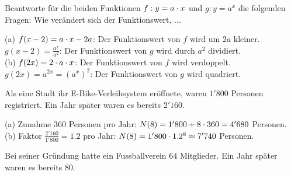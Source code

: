 \documentclass[11pt]{exam}
\begin{document}
\begin{questions}
\noaddpoints
\question[\totalpoints]
\addpoints
Beantworte für die beiden Funktionen $f:y=a\cdot x$ und $g:y=a^x$ die folgenden Fragen: Wie verändert sich der Funktionswert, ...
{\begin{solution}
		(a) $f(x-2)=a\cdot x-2a$: Der Funktionswert von $f$ wird um $2a$ kleiner. $g(x-2)=\frac{a^x}{a^2}$: Der Funktionswert von $g$ wird durch $a^2$ dividiert.\\
		(b) $f(2x)=2\cdot a\cdot x$: Der Funktionswert von $f$ wird verdoppelt. $g(2x)=a^{2x}=\left(a^x\right)^2$: Der Funktionswert von $g$ wird quadriert.
\end{solution}}
{}

\question[4]
Als eine Stadt ihr E-Bike-Verleihsystem eröffnete, waren $1'800$ Personen registriert. Ein Jahr später waren es bereits $2'160$.
{\begin{solution}
		(a) Zunahme $360$ Personen pro Jahr: $N(8)=1'800+8\cdot360=4'680$ Personen.\\
		(b) Faktor $\frac{2'160}{1'800}=1.2$ pro Jahr: $N(8)=1'800\cdot1.2^8\approx7'740$ Personen.
\end{solution}}
{}

\question[4]
Bei seiner Gründung hatte ein Fussballverein $64$ Mitglieder. Ein Jahr später waren es bereits $80$.
\begin{parts}

\end{parts}
\end{questions}
\end{document}
